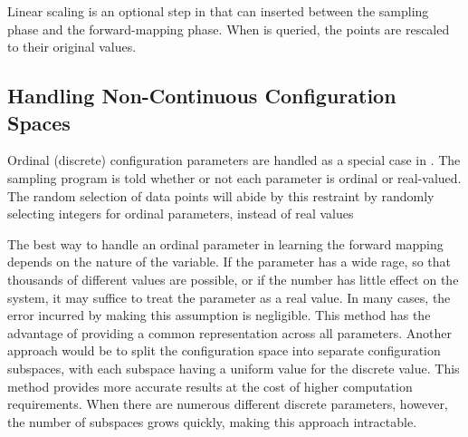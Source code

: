 Linear scaling is an optional step in \fw that can inserted between the sampling phase and the forward-mapping phase.
When \fw is queried, the points are rescaled to their original values.



\subsection{Handling Non-Continuous Configuration Spaces}

Ordinal (discrete) configuration parameters are handled as a special case in \fw.
The sampling program is told whether or not each parameter is ordinal or real-valued.
The random selection of data points will abide by this restraint by randomly selecting integers for ordinal parameters, instead of real values

The best way to handle an ordinal parameter in learning the forward mapping depends on the nature of the variable.
If the parameter has a wide rage, so that thousands of different values are possible, or if the number has little effect on the system, it may suffice to treat the parameter as a real value.
In many cases, the error incurred by making this assumption is negligible.
This method has the advantage of providing a common representation across all parameters.
Another approach would be to split the configuration space into separate configuration subspaces, with each subspace having a uniform value for the discrete value.
This method provides more accurate results at the cost of higher computation requirements.
When there are numerous different discrete parameters, however, the number of subspaces grows quickly, making this approach intractable.



